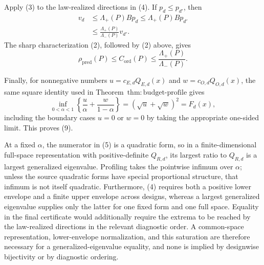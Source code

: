 Apply (3) to the law-realized directions in (4).  If \(p_d\le p_{d'}\), then
\[
\begin{aligned}
 v_d
 &\le\Lambda_+(P)Bp_d
 \le\Lambda_+(P)Bp_{d'}\\
 &\le\frac{\Lambda_+(P)}{\Lambda_-(P)}v_{d'}.
                                                               \tag{4}
\end{aligned}
\]
The sharp characterization (2), followed by (2) above, gives
\[
 \rho_{\mathrm{pred}}(P)
 \le C_{\mathrm{ord}}(P)
 \le\frac{\Lambda_+(P)}{\Lambda_-(P)}.
\]

Finally, for nonnegative numbers \(u= c_{E,d}Q_{E,d}(x)\) and \(w=c_{O,d}Q_{O,d}(x)\), the same square identity used in Theorem~\(\mathrm{thm{:}budget\text{-}profile}\) gives
\[
 \inf_{0<\alpha<1}\left\{\frac u\alpha+\frac w{1-\alpha}\right\}
 =(\sqrt u+\sqrt w)^2=F_d(x),                            \tag{5}
\]
including the boundary cases \(u=0\) or \(w=0\) by taking the appropriate one-sided limit.  This proves (9).

At a fixed \(\alpha\), the numerator in (5) is a quadratic form, so in a finite-dimensional full-space representation with positive-definite \(Q_{R,d}\), its largest ratio to \(Q_{R,d}\) is a largest generalized eigenvalue.  Profiling takes the pointwise infimum over \(\alpha\); unless the source quadratic forms have special proportional structure, that infimum is not itself quadratic.  Furthermore, (4) requires both a positive lower envelope and a finite upper envelope across designs, whereas a largest generalized eigenvalue supplies only the latter for one fixed form and one full space.  Equality in the final certificate would additionally require the extrema to be reached by the law-realized directions in the relevant diagnostic order.  A common-space representation, lower-envelope normalization, and this saturation are therefore necessary for a generalized-eigenvalue equality, and none is implied by designwise bijectivity or by diagnostic ordering.